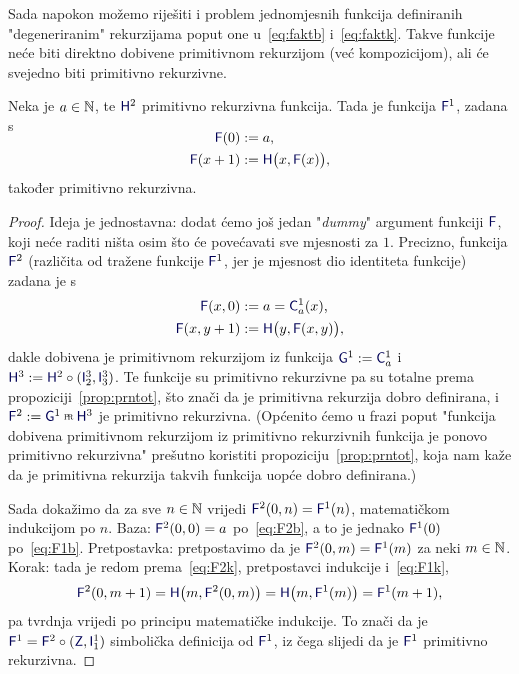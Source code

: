 Sada napokon možemo riješiti i problem jednomjesnih funkcija definiranih "degeneriranim" rekurzijama poput one u~\eqref{eq:faktb} i~\eqref{eq:faktk}. Takve funkcije neće biti direktno dobivene primitivnom rekurzijom (već kompozicijom), ali će svejedno biti primitivno rekurzivne.

\begin{propozicija}\label{prop:F1prn}
Neka je $a\in{\mathbb N}$, te $\f H^2$ primitivno rekurzivna funkcija. Tada je funkcija $\f F^1$, zadana s
\begin{align}
\SwapAboveDisplaySkip
\label{eq:F1b}
    \f F(0)&:=a\text,\\
\label{eq:F1k}
    \f F(x+1)&:=\f H\bigl(x,\f F(x)\bigr)\text,
\end{align}
također primitivno rekurzivna.
\end{propozicija}
\begin{proof}
Ideja je jednostavna: dodat ćemo još jedan "\!\emph{dummy}" argument funkciji $\f F$, koji neće raditi ništa osim što će povećavati sve mjesnosti za $1$. Precizno, funkcija $\f F^2$ (različita od tražene funkcije $\f F^1$\!, jer je mjesnost dio identiteta funkcije) zadana je s
\begin{align}
\label{eq:F2b}
    \f F(x,0)&:=a=\f C_a^1(x)\text,\\
\label{eq:F2k}
    \f F(x,y+1)&:=\f H\bigl(y,\f F(x,y)\bigr)\text,
\end{align}
dakle dobivena je primitivnom rekurzijom iz funkcija $\f G^1:=\f C_a^1$ i $\f H^3:=\f H^2\circ(\f I_2^3,\f I_3^3)$. Te funkcije su primitivno rekurzivne pa su totalne prema propoziciji~\ref{prop:prntot}, što znači da je primitivna rekurzija dobro definirana, i $\f F^2:=\f G^1\pr\f H^3$ je primitivno rekurzivna. (Općenito ćemo u frazi poput "funkcija dobivena primitivnom rekurzijom iz primitivno rekurzivnih funkcija je ponovo primitivno rekurzivna" prešutno koristiti propoziciju~\ref{prop:prntot}, koja nam kaže da je primitivna rekurzija takvih funkcija uopće dobro definirana.)

Sada dokažimo da za sve $n\in{\mathbb N}$ vrijedi $\f F^2(0,n)=\f F^1(n)$, matematičkom indukcijom po $n$. Baza: $\f F^2(0,0)=a$ po~\eqref{eq:F2b}, a to je jednako $\f F^1(0)$ po~\eqref{eq:F1b}. Pretpostavka: pretpostavimo da je $\f F^2(0,m)=\f F^1(m)$ za neki $m\in{\mathbb N}$. Korak: tada je redom prema~\eqref{eq:F2k}, pretpostavci indukcije i~\eqref{eq:F1k},
\begin{equation}
    \f F^2(0,m+1)=\f H\bigl(m,\f F^2(0,m)\bigr)=\f H\bigl(m,\f F^1(m)\bigr)=\f F^1(m+1)\text,
\end{equation}
pa tvrdnja vrijedi po principu matematičke indukcije. To znači da je $\f F^1=\f F^2\circ(\f Z,\f I_1^1)$ simbolička definicija od $\f F^1$, iz čega slijedi da je $\f F^1$ primitivno rekurzivna.
\end{proof}

